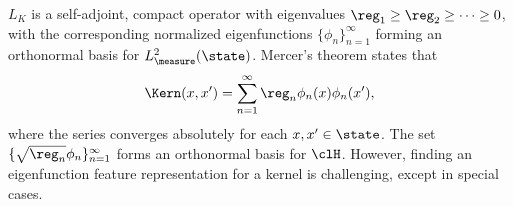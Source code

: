 $L_K$ is a self-adjoint, compact operator with eigenvalues $\reg_1 \geq \reg_2 \geq \cdots \geq 0$, with the corresponding normalized eigenfunctions $\{\phi_n\}_{n=1}^\infty$ forming an orthonormal basis for $L^2_\measure(\state)$. Mercer's theorem states that 
\begin{equation}
\Kern(x,x') = \sum_{n=1}^\infty \reg_n \phi_n(x) \phi_n(x'),
\end{equation}
where the series converges absolutely for each $x,x' \in \state$. The set $\{\sqrt{\reg_n}\phi_n\}_{n=1}^\infty$ forms an orthonormal basis for $\clH$. However, finding an eigenfunction feature representation for a kernel is challenging, except in special cases. 
